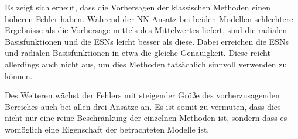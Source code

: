 Es zeigt sich erneut, dass die Vorhersagen der klassischen Methoden einen höheren Fehler haben. Während der \textsc{NN}-Ansatz bei beiden Modellen schlechtere Ergebnisse als die Vorhersage mittels des Mittelwertes liefert, sind die radialen Basisfunktionen und die \textsc{ESN}s leicht besser als diese. Dabei erreichen die \textsc{ESN}s und radialen Basisfunktionen in etwa die gleiche Genauigkeit. Diese reicht allerdings auch nicht aus, um dies Methoden tatsächlich sinnvoll verwenden zu können. 

Des Weiteren wächst der Fehlers mit steigender Größe des vorherzusagenden Bereiches auch bei allen drei Ansätze an. Es ist somit zu vermuten, dass dies nicht nur eine reine Beschränkung der einzelnen Methoden ist, sondern dass es womöglich eine Eigenschaft der betrachteten Modelle ist. 
